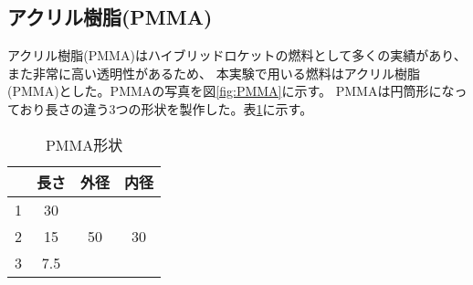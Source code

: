 \subsection{アクリル樹脂(PMMA)}
アクリル樹脂(PMMA)はハイブリッドロケットの燃料として多くの実績があり、また非常に高い透明性があるため、
本実験で用いる燃料はアクリル樹脂(PMMA)とした。PMMAの写真を図\ref{fig:PMMA}に示す。
PMMAは円筒形になっており長さの違う3つの形状を製作した。表\ref{tab:PMMA}に示す。


\begin{table}[htb]
\begin{center}
\caption{PMMA形状}
\begin{tabular}{|l|c|c|c|} \hline
 & 長さ  & 外径 & 内径\\ \hline
1 & 30  &  & \\ \cline{1-2}
2 & 15  & 50 & 30\\ \cline{1-2}
3 & 7.5 &  &  \\ \hline
\end{tabular}
\label{tab:PMMA}
\end{center}
\end{table}

